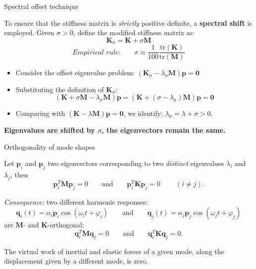 \documentclass[aspectratio=169]{beamer}
\begin{document}
\begin{frame}{Spectral offset technique}
  \vspace{-0.2cm}
  \begin{tcolorbox}[colback=darkred!10,colframe=darkred!40!black]
    \small To ensure that the stiffness matrix is \emph{strictly} positive definite, a \textbf{spectral shift} is employed. Given \( \sigma > 0 \), define the modified stiffness matrix as:
    \[
      \mathbf{K}_\sigma = \mathbf{K} + \sigma \mathbf{M}
    \]
    $${\textit{Empirical rule:}} \qquad \sigma\approx \frac{1}{100}\frac{\text{tr}(\mathbf K)}{\text{tr}(\mathbf M)}$$
  \end{tcolorbox}
  \begin{itemize}
    \small
    \item Consider the offset eigenvalue problem:
          $            (\mathbf{K}_\sigma - \lambda_\sigma \mathbf{M}) \mathbf{p} = \mathbf{0}
          $
    \item Substituting the definition of \( \mathbf{K}_\sigma \):
          \[
            (\mathbf{K} + \sigma \mathbf{M} - \lambda_\sigma \mathbf{M}) \mathbf{p}
            = (\mathbf{K} + (\sigma - \lambda_\sigma)\mathbf{M}) \mathbf{p} = \mathbf{0}
          \]
    \item Comparing with \( (\mathbf{K} -\lambda \mathbf{M}) \mathbf{p}=\mathbf 0 \), we identify: $\lambda_\sigma = \lambda+\sigma > 0$.
  \end{itemize}
  \begin{tcolorbox}[colback=darkred!10,colframe=darkred!40!black]
    \centering \textbf{Eigenvalues are shifted by \( \sigma \), the eigenvectors remain the same.}
  \end{tcolorbox}

\end{frame}

\begin{frame}{Orthogonality of mode shapes}
  \begin{tcolorbox}[colback=darkred!10,colframe=darkred!40!black]
    Let $\mathbf p_i$ and $\mathbf p_j$ two eigenvectors corresponding to two \emph{distinct} eigenvalues $\lambda_i$ and $\lambda_j$, then
    $$
      \mathbf p_i^T\mathbf M\mathbf p_j  =0
      \qquad\text{and}\qquad
      \mathbf p_i^T\mathbf K\mathbf p_j  =0\qquad\ (i\neq j).
    $$
  \end{tcolorbox}
  \emph{Consequence:} two different harmonic responses:
  $$\mathbf q_i(t)=\alpha_i \mathbf p_i \cos(\omega_i t+\varphi_i)\qquad \text{and}\qquad \mathbf q_j(t)=\alpha_j \mathbf p_j \cos(\omega_j t+\varphi_j)$$
  are $\mathbf M$- and $\mathbf K$-orthogonal:
  $$\mathbf q_i^T\mathbf M\mathbf q_j=0\qquad\text{and}\qquad \mathbf q_i^T\mathbf K\mathbf q_j=0.$$
  \vspace{-0.5cm}
  \begin{block}{}
    \centering The virtual work of inertial and elastic forces of a given mode, along the displacement given by a different mode, is zero.
  \end{block}
\end{frame}
\end{document}
